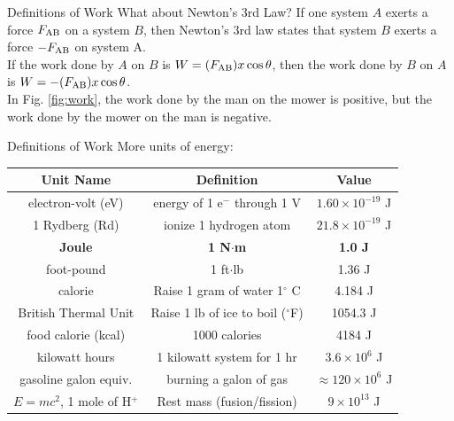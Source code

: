 \documentclass{beamer}
\begin{document}
\begin{frame}{Definitions of Work}
What about Newton's 3rd Law?  If one system $A$ exerts a force $F_{\rm AB}$ on a system $B$, then Newton's 3rd law states that system $B$ exerts a force $-F_{\rm AB}$ on system A. \\
\vspace{0.5cm}
If \alert{the work done by $A$ on $B$} is $W = (F_{\rm AB})x\cos\theta$, then \alert{the work done by $B$ on $A$} is $W = -(F_{\rm AB})x\cos\theta$. \\
\vspace{0.5cm}
In Fig. \ref{fig:work}, the work done by the man on the mower is positive, but the work done by the mower on the man is negative.
\end{frame}

\begin{frame}{Definitions of Work}
\small
More units of energy:
\begin{table}
\centering
\begin{tabular}{c | c | c}
\alert{Unit Name} & \alert{Definition} & \alert{Value} \\ \hline
electron-volt (eV) & energy of 1 e$^{-}$ through 1 V & $1.60\times 10^{-19}$ J \\ \hline
1 Rydberg (Rd) & ionize 1 hydrogen atom & $21.8\times 10^{-19}$ J \\ \hline
\textbf{Joule} & \textbf{1 N$\cdot$m} & \textbf{1.0 J} \\ \hline
foot-pound & 1 ft$\cdot$lb & 1.36 J \\ \hline 
calorie & Raise 1 gram of water 1$^{\circ}$ C & 4.184 J \\ \hline
British Thermal Unit & Raise 1 lb of ice to boil ($^{\circ}$F) & 1054.3 J \\ \hline
food calorie (kcal) & 1000 calories & 4184 J \\ \hline
kilowatt hours & 1 kilowatt system for 1 hr & $3.6\times 10^6$ J \\ \hline
gasoline galon equiv. & burning a galon of gas & $\approx 120 \times 10^6$ J \\ \hline
$E = mc^2$, 1 mole of H$^{+}$ & Rest mass (fusion/fission) & $9 \times 10^{13}$ J \\ \hline
\end{tabular}
\end{table}
\end{frame}
\end{document}
